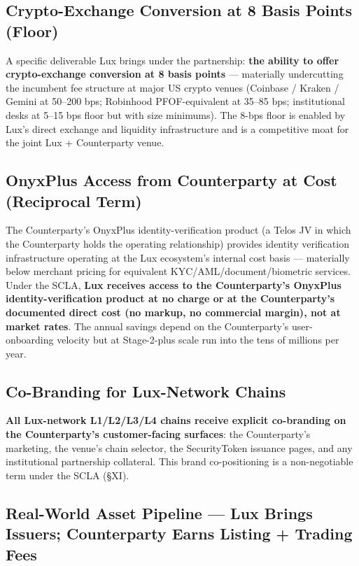 \documentclass[11pt,letterpaper]{article}
\begin{document}
\subsection*{Crypto-Exchange Conversion at 8 Basis Points (Floor)}

A specific deliverable Lux brings under the partnership: \textbf{the
ability to offer crypto-exchange conversion at 8 basis points} ---
materially undercutting the incumbent fee structure at major US
crypto venues (Coinbase / Kraken / Gemini at 50--200 bps; Robinhood
PFOF-equivalent at 35--85 bps; institutional desks at 5--15 bps
floor but with size minimums). The 8-bps floor is enabled by Lux's
direct exchange and liquidity infrastructure and is a competitive
moat for the joint Lux + Counterparty venue.

\subsection*{OnyxPlus Access from Counterparty at Cost (Reciprocal Term)}

The Counterparty's OnyxPlus identity-verification product (a Telos JV in which the Counterparty holds the operating relationship) provides identity verification
infrastructure operating at the Lux ecosystem's internal cost basis
--- materially below merchant pricing for equivalent
KYC/AML/document/biometric services. Under the SCLA, \textbf{Lux
receives access to the Counterparty's OnyxPlus identity-verification
product at no charge or at the Counterparty's documented direct cost
(no markup, no commercial margin), not at market rates}. The annual savings depend on
the Counterparty's user-onboarding velocity but at Stage-2-plus
scale run into the tens of millions per year.

\subsection*{Co-Branding for Lux-Network Chains}

\textbf{All Lux-network L1/L2/L3/L4 chains receive explicit
co-branding on the Counterparty's customer-facing surfaces}: the
Counterparty's marketing, the venue's chain selector, the
SecurityToken issuance pages, and any institutional partnership
collateral. This brand co-positioning is a non-negotiable term
under the SCLA (\S XI).

\subsection*{Real-World Asset Pipeline --- Lux Brings Issuers; Counterparty Earns Listing + Trading Fees}
\end{document}
